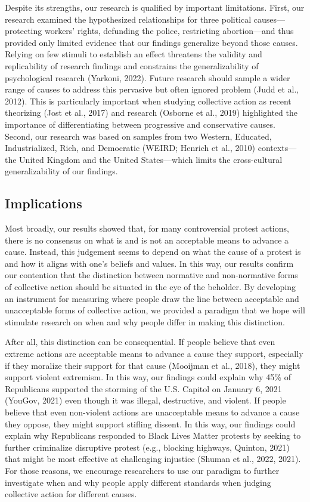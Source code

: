 \documentclass[twocolumn, 11pt, letterpaper]{article}
\begin{document}
Despite its strengths, our research is qualified by important
limitations. First, our research examined the hypothesized relationships
for three political causes---protecting workers' rights, defunding the
police, restricting abortion---and thus provided only limited evidence
that our findings generalize beyond those causes. Relying on few stimuli
to establish an effect threatens the validity and replicability of
research findings and constrains the generalizability of psychological
research (Yarkoni, 2022). Future research should sample a wider range of
causes to address this pervasive but often ignored problem (Judd et al.,
2012). This is particularly important when studying collective action as
recent theorizing (Jost et al., 2017) and research (Osborne et al.,
2019) highlighted the importance of differentiating between progressive
and conservative causes. Second, our research was based on samples from
two Western, Educated, Industrialized, Rich, and Democratic (WEIRD;
Henrich et al., 2010) contexts---the United Kingdom and the United
States---which limits the cross-cultural generalizability of our
findings.

\hypertarget{implications}{%
\subsection{Implications}\label{implications}}

Most broadly, our results showed that, for many controversial protest
actions, there is no consensus on what is and is not an acceptable means
to advance a cause. Instead, this judgement seems to depend on what the
cause of a protest is and how it aligns with one's beliefs and values.
In this way, our results confirm our contention that the distinction
between normative and non-normative forms of collective action should be
situated in the eye of the beholder. By developing an instrument for
measuring where people draw the line between acceptable and unacceptable
forms of collective action, we provided a paradigm that we hope will
stimulate research on when and why people differ in making this
distinction.

After all, this distinction can be consequential. If people believe that
even extreme actions are acceptable means to advance a cause they
support, especially if they moralize their support for that cause
(Mooijman et al., 2018), they might support violent extremism. In this
way, our findings could explain why 45\% of Republicans supported the
storming of the U.S. Capitol on January 6, 2021 (YouGov, 2021) even
though it was illegal, destructive, and violent. If people believe that
even non-violent actions are unacceptable means to advance a cause they
oppose, they might support stifling dissent. In this way, our findings
could explain why Republicans responded to Black Lives Matter protests
by seeking to further criminalize disruptive protest (e.g., blocking
highways, Quinton, 2021) that might be most effective at challenging
injustice (Shuman et al., 2022, 2021). For those reasons, we encourage
researchers to use our paradigm to further investigate when and why
people apply different standards when judging collective action for
different causes.
\end{document}
